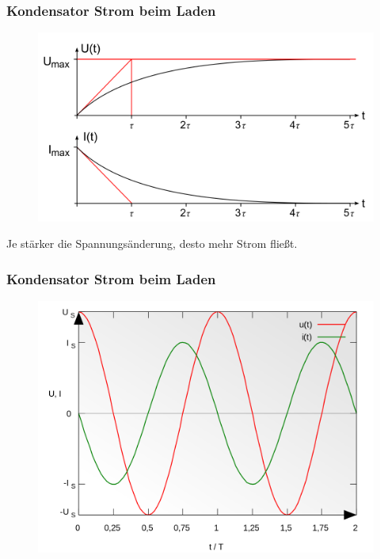 \begin{frame}
  \frametitle{Kondensator Strom beim Laden}
  \begin{center}
    \begin{figure}
      \includegraphics[width=1\textwidth,height=.6\textheight,keepaspectratio]{a03/Ladevorgang.png}
    \end{figure}
    \Large{Je stärker die Spannungsänderung, desto mehr Strom fließt.}
  \end{center}
\end{frame}

\begin{frame}
  \frametitle{Kondensator Strom beim Laden}
  \begin{center}
    \begin{figure}
      \includegraphics[width=1\textwidth,height=.75\textheight,keepaspectratio]{a03/Sinus_Voltage_and_Current_of_a_Capacitor.png}
    \end{figure}
  \end{center}
\end{frame}

